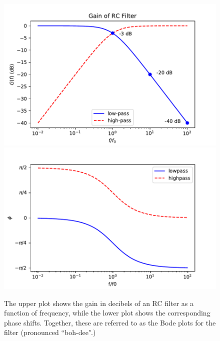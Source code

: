 \documentclass[12pt,oneside]{book}
\begin{document}
\begin{figure}[htbp]
\begin{center}
\includegraphics[height=0.3\textheight]{figs/rcgaindb.pdf} \\
\includegraphics[height=0.3\textheight]{figs/rcphase.pdf} \\
\caption{ The upper plot shows the gain in decibels of an RC filter as a function of frequency, while the lower plot shows the corresponding phase shifts.  Together, these are referred to as the Bode plots for the filter (pronounced ``boh-dee".)}
\label{fig:rcgaindb}
\end{center}
\end{figure}
\end{document}
